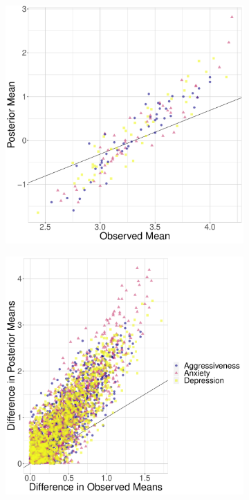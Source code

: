 \documentclass[a4paper,usenames,dvipsnames]{article}
\begin{document}
\begin{figure}[!ht]
\begin{subfigure}{.5\textwidth}
	\centering
	\includegraphics[width=.9\textwidth]{figures/corrObsMeanPostMean.pdf}
\end{subfigure}%
\begin{subfigure}{.5\textwidth}
	\centering
	\includegraphics[width=.9\textwidth]{figures/diffCorrObsMeanPostMean.pdf}

\end{subfigure}
\end{figure}
\end{document}
